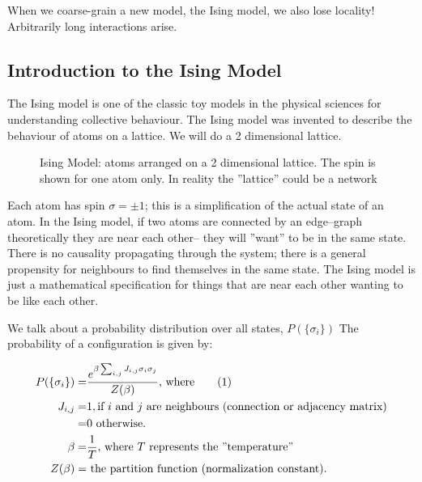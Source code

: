 \documentclass[]{article}
\newcommand\numberthis{\addtocounter{equation}{1}\tag{\theequation}}
\begin{document}
When we coarse-grain a new model, the Ising model, we also lose locality! Arbitrarily long interactions arise. 
\subsection{Introduction to the Ising Model}

The Ising model is one of the classic toy models in the physical sciences for understanding collective behaviour. The Ising model was invented to describe the behaviour of atoms  on a lattice. We will do a 2 dimensional lattice. 

\begin{figure}[H]
	\begin{center}
		\caption[Ising Model: atoms arranged on a 2 dimensional lattice]{Ising Model: atoms arranged on a 2 dimensional lattice. The spin is shown for one atom only. In reality the ''lattice'' could be a network}
	\end{center}
\end{figure}

Each atom has spin $\sigma=\pm 1$; this is a simplification of the actual state of an atom. In the Ising model, if two atoms are connected by an edge--graph theoretically they are near each other-- they will ''want'' to be in the same state. There is no causality propagating through the system; there is a general propensity for neighbours to find themselves in the same state. The Ising model is just a mathematical specification for things that are near each other wanting to be like each other.

We talk about a probability distribution over all states, $P(\{\sigma_i\})$ The probability of a configuration is given by:

\begin{align*}
	P(\{\sigma_i\}) =& \frac{e^{\beta \sum_{i,j} J_{i,j} \sigma_i \sigma_j}}{Z(\beta)}\text{, where} \numberthis \label{eq:coarse_ising:P} \\
	J_{i,j} =& 1,\text{if $i$ and $j$ are neighbours (connection or adjacency matrix)}\\
	=& 0 \text{ otherwise.}\\
	\beta =& \frac{1}{T} \text{, where $T$ represents the ''temperature''}\\
	Z(\beta) =& \text{ the partition function (normalization constant).}
\end{align*}
 
\end{document}
